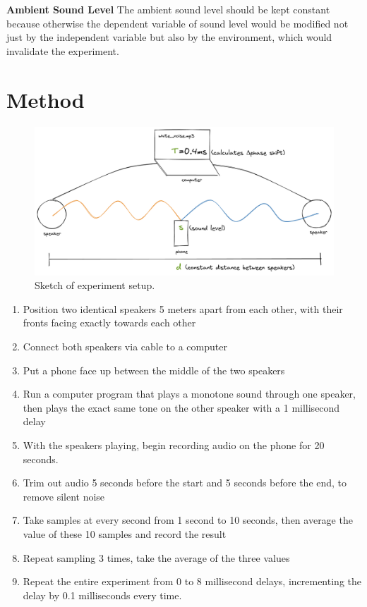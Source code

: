 \documentclass[index]{subfiles}
\begin{document}
\textbf{Ambient Sound Level} The ambient sound level should be kept constant because otherwise the dependent variable of sound level would be modified not just by the independent variable but also by the environment, which would invalidate the experiment.

\section{Method}

\begin{figure}[H]
    \centering
    \includegraphics[scale=0.24]{sound_diagram.png}
    \caption{Sketch of experiment setup.}
\end{figure}

\begin{enumerate}
    \item Position two identical speakers 5 meters apart from each other, with their fronts facing exactly towards each other
    \item Connect both speakers via cable to a computer
    \item Put a phone face up between the middle of the two speakers
    \item Run a computer program that plays a monotone sound through one speaker, then plays the exact same tone on the other speaker with a 1 millisecond delay
    \item With the speakers playing, begin recording audio on the phone for 20 seconds.
    \item Trim out audio 5 seconds before the start and 5 seconds before the end, to remove silent noise
    \item Take samples at every second from 1 second to 10 seconds, then average the value of these 10 samples and record the result
    \item Repeat sampling 3 times, take the average of the three values
    \item Repeat the entire experiment from 0 to 8 millisecond delays, incrementing the delay by 0.1 milliseconds every time.
\end{enumerate}
\end{document}
